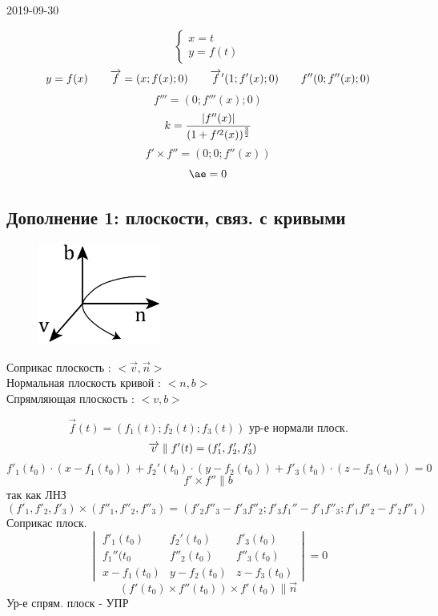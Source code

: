 \documentclass[main]{subfiles}
\begin{document}
\begin{lect} {2019-09-30}
		\begin{Example}
			\[\begin{cases}
					x = t\\
					y = f(t)
			\end{cases}\]
			\[y = f(x) \quad\quad \overrightarrow{f} = (x; f(x); 0) \quad\quad \overrightarrow{f}'(1; f'(x); 0) \quad\quad f''(0; f''(x); 0)\]
			\[f'''= (0; f'''(x); 0)\]
			\[k = \frac{\left|f''(x)\right|}{(1 + f'^2(x))^{\frac{3}{2}} }\]
			\[f' \times f'' = (0; 0; f''(x))\]
			\[\ae = 0\]
		\end{Example}

\subsection{Дополнение 1: плоскости, связ. с кривыми}

		\begin{definition}
			\begin{figure}[H]
			    \includegraphics[width=4cm]{pics/4_1.png}
			    \centering
			\end{figure}

		    Соприкас плоскость : $<\vec{v}, \vec{n}>$\\
			Нормальная плоскость кривой : $<n, b>$\\
			Спрямляющая плоскость : $<v, b>$
		\end{definition}

		\begin{Theorem}
			\[\vec{f}(t) = (f_1(t); f_2(t); f_3(t)) \text{ ур-е нормали плоск.}\]
			\[\overrightarrow{v} \parallel f'(t) = (f_1', f_2', f_3') \quad \]
            \[f'_1(t_0) \cdot(x - f_1(t_0)) +
			f_2'(t_0) \cdot (y - f_2(t_0)) + f'_3(t_0) \cdot (z - f_3(t_0)) = 0\]
			\[f' \times f'' \parallel b\]
			так как ЛНЗ
			\[(f'_1, f'_2, f'_3) \times (f''_1, f''_2, f''_3) = (f'_2 f''_3 - f'_3 f''_2;
			f'_3 f_1'' - f'_1 f''_3; f'_1 f''_2 - f'_2 f''_1)\]
			Соприкас плоск.
			\[\begin{vmatrix}
				f'_1(t_0) & f_2'(t_0) & f'_3(t_0)\\
				f_1''(t_0 & f''_2(t_0) & f''_3(t_0)\\
				x - f_1(t_0) & y - f_2(t_0) & z - f_3(t_0)
			\end{vmatrix} = 0\]
			\[(f'(t_0) \times f''(t_0)) \times f'(t_0) \parallel \vec{n}\]
			Ур-е спрям. плоск - УПР
		\end{Theorem}


\end{lect}
\end{document}
